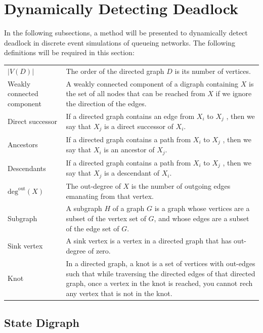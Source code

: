 \documentclass{article}
\begin{document}
\section{Dynamically Detecting Deadlock}\label{sec:detectdeadlock}
In the following subsections, a method will be presented to dynamically detect deadlock in discrete event simulations of queueing networks.
The following definitions will be required in this section:

\begin{tabular}{ p{5cm} p{10cm} }
  $\left| V(D) \right|$        & The order of the directed graph $D$ is its number of vertices. \\
  Weakly connected component   & A weakly connected component of a digraph containing $X$ is the set of all nodes that can be reached from $X$ if we ignore the direction of the edges. \\
  Direct successor             & If a directed graph contains an edge from $X_i$ to $X_j$ , then we say that $X_j$ is a direct successor of $X_i$. \\
  Ancestors                    & If a directed graph contains a path from $X_i$ to $X_j$ , then we say that $X_i$ is an ancestor of $X_j$. \\
  Descendants                  & If a directed graph contains a path from $X_i$ to $X_j$ , then we say that $X_j$ is a descendant of $X_i$. \\
  $\text{deg}^{\text{out}}(X)$ & The out-degree of $X$ is the number of outgoing edges emanating from that vertex. \\
  Subgraph                     & A subgraph $H$ of a graph $G$ is a graph whose vertices are a subset of the vertex set of $G$, and whose edges are a subset of the edge set of $G$. \\
  Sink vertex                  & A sink vertex is a vertex in a directed graph that has out-degree of zero.\\
  Knot                         & In a directed graph, a knot is a set of vertices with out-edges such that while traversing the directed edges of that directed graph, once a vertex in the knot is reached, you cannot rech any vertex that is not in the knot.\\
\end{tabular}


\subsection{State Digraph}
\end{document}

